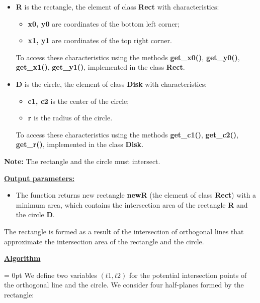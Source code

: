 \documentclass{report}
\begin{document}
	\begin{itemize}
		\item {\bfseries	R} is the rectangle, the element of class {\bfseries Rect} with characteristics:
		\begin{itemize}
			\item {\bfseries x0, y0} are coordinates of the bottom left corner;
			\item {\bfseries x1, y1} are coordinates of the top right corner.
		\end{itemize}
		To access these characteristics using the methods  {\bfseries get\_x0()}, {\bfseries get\_y0()}, {\bfseries get\_x1()}, {\bfseries get\_y1()}, implemented in the class {\bfseries Rect}.
		
		\item {\bfseries D}  is the circle, the element of class {\bfseries Disk} with characteristics:
		\begin{itemize}
			\item {\bfseries c1, c2}  is the center of the circle;
			\item {\bfseries r}  is  the radius of the circle.
		\end{itemize}
	
		To access these characteristics using the methods {\bfseries get\_c1()}, {\bfseries get\_c2()}, {\bfseries get\_r()}, implemented in the class {\bfseries Disk}.
	\end{itemize}

	{\bfseries Note:} The rectangle and the circle must intersect.
	
	{\bfseries\underline{Output parameters:}}
	
	\begin{itemize}
		\item The function returns new rectangle {\bfseries newR} (the element of class {\bfseries Rect}) with a minimum area, which contains the intersection area of the rectangle {\bfseries R} and the circle {\bfseries D}.
	\end{itemize}
	The rectangle is formed as a result of the intersection of orthogonal lines that approximate the intersection area of the rectangle and the circle.
	
	\underline{\bfseries{Algorithm}}
	
	
	\parindent= 0pt We define two variables $(t1, t2)$ for the potential intersection points of the orthogonal line and the circle.
	We consider four half-planes formed by the rectangle:
	
\end{document}
